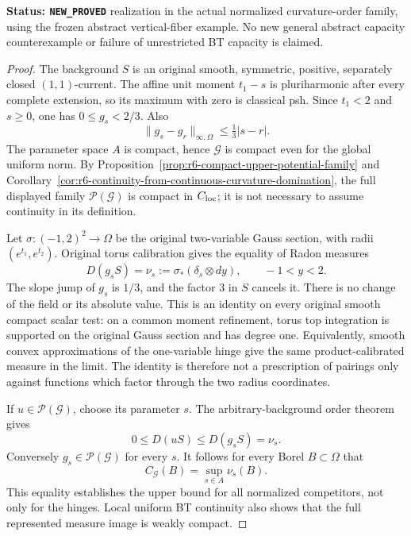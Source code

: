 \documentclass[11pt,a4paper]{article}
\numberwithin{equation}{section}
\theoremstyle{definition}
\theoremstyle{remark}
\begin{document}
\noindent\textbf{Status: \texttt{NEW\_PROVED}} realization in
the actual normalized curvature-order family, using the frozen
abstract vertical-fiber example. No new general abstract capacity
counterexample or failure of unrestricted BT capacity is claimed.

\begin{proof}
The background $S$ is an original smooth, symmetric, positive,
separately closed $(1,1)$-current. The affine unit moment $t_1-s$
is pluriharmonic after every complete extension, so its maximum
with zero is classical psh. Since $t_1<2$ and $s\ge0$, one has
$0\le g_s<2/3$. Also
\[
                  \|g_s-g_r\|_{\infty,\Omega}
                           \le\tfrac13|s-r|.
\]
The parameter space $A$ is compact, hence $\mathscr G$ is compact
even for the global uniform norm. By
Proposition~\ref{prop:r6-compact-upper-potential-family} and
Corollary~\ref{cor:r6-continuity-from-continuous-curvature-domination},
the full displayed family $\mathscr P(\mathscr G)$ is compact in
$C_{\rm loc}$; it is not necessary to assume continuity in its
definition.

Let $\sigma:(-1,2)^2\to\Omega$ be the original two-variable
Gauss section, with radii $(e^{t_1},e^{t_2})$. Original torus
calibration gives the equality of Radon measures
\begin{equation}
                D(g_sS)=\nu_s
                    :=\sigma_*(\delta_s\otimes dy),
             \qquad -1<y<2.
 \label{eq:r6-vertical-hinge-measure}
\end{equation}
The slope jump of $g_s$ is $1/3$, and the factor $3$ in $S$
cancels it. There is no change of the field or its absolute value.
This is an identity on every original smooth compact scalar test:
on a common moment refinement, torus top integration is supported
on the original Gauss section and has degree one. Equivalently,
smooth convex approximations of the one-variable hinge give the
same product-calibrated measure in the limit. The identity is
therefore not a prescription of pairings only against functions
which factor through the two radius coordinates.

If $u\in\mathscr P(\mathscr G)$, choose its parameter $s$.
The arbitrary-background order theorem gives
\[
                       0\le D(uS)\le D(g_sS)=\nu_s.
\]
Conversely $g_s\in\mathscr P(\mathscr G)$ for every $s$.
It follows for every Borel $B\subset\Omega$ that
\begin{equation}
                  C_{\mathscr G}(B)=\sup_{s\in A}\nu_s(B).
 \label{eq:r6-full-family-vertical-capacity}
\end{equation}
This equality establishes the upper bound for all normalized
competitors, not only for the hinges. Local uniform BT continuity
also shows that the full represented measure image is weakly compact.


\end{proof}
\end{document}
